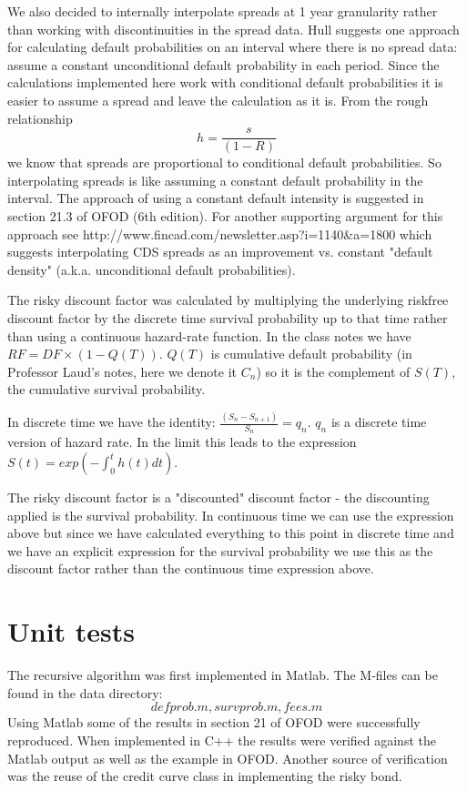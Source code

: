 We also decided to internally interpolate spreads at 1 year
granularity rather than working with discontinuities in the spread
data.  Hull suggests one approach for calculating default
probabilities on an interval where there is no spread data: assume a
constant unconditional default probability in each period.  Since
the calculations implemented here work with conditional default
probabilities it is easier to assume a spread and leave the
calculation as it is.  From the rough relationship $$h =\frac{s}{(1-R)}$$ 
we know that spreads are proportional to
conditional default probabilities.  So interpolating spreads is like
assuming a constant default probability in the interval.  The
approach of using a constant default intensity is suggested in
section 21.3 of OFOD (6th edition). For another supporting argument
for this approach see
http://www.fincad.com/newsletter.asp?i=1140\&a=1800 which suggests
interpolating CDS spreads as an improvement vs. constant "default
density" (a.k.a. unconditional default probabilities).

The risky discount factor was calculated by multiplying the
underlying riskfree discount factor by the discrete time survival
probability up to that time rather than using a continuous
hazard-rate function.  In the class notes we have $RF = DF \times
(1 - Q(T))$.  $Q(T)$ is cumulative default probability (in
Professor Laud's notes, here we denote it $C_{n}$) so it is the
complement of $S(T)$, the cumulative survival probability.

In discrete time we have the identity: $\frac{(S_{n} -
S_{n+1})}{S_{n}} = q_{n}$.  $q_{n}$ is a discrete time version of
hazard rate.  In the limit this leads to the expression $S(t) =
exp(-\int_0^th(t)dt)$.

The risky discount factor is a "discounted" discount factor - the
discounting applied is the survival probability. In continuous time
we can use the expression above but since we have calculated
everything to this point in discrete time and we have an explicit
expression for the survival probability we use this as the discount
factor rather than the continuous time expression above.

\section{Unit tests}

The recursive algorithm was first implemented in Matlab.  The
M-files can be found in the data directory: $$defprob.m, survprob.m,
fees.m$$ Using Matlab some of the results in section 21 of OFOD
were successfully reproduced.  When implemented in C++ the results
were verified against the Matlab output as well as the example in
OFOD.  Another source of verification was the reuse of the credit
curve class in implementing the risky bond.

